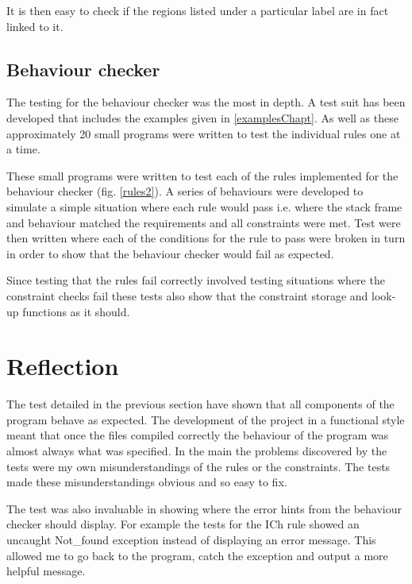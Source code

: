 It is then easy to check if the regions listed under a particular label are in fact linked to it. 

\subsection{Behaviour checker}

The testing for the behaviour checker was the most in depth. A test suit has been developed that includes the examples given in \ref{examplesChapt}. As well as these approximately 20 small programs were written to test the individual rules one at a time. 

These small programs were written to test each of the rules implemented for the behaviour checker (fig. \ref{rules2}). A series of behaviours were developed to simulate a simple situation where each rule would pass i.e. where the stack frame and behaviour matched the requirements and all constraints were met. Test were then written where each of the conditions for the rule to pass were broken in turn in order to show that the behaviour checker would fail as expected. 

Since testing that the rules fail correctly involved testing situations where the constraint checks fail these tests also show that the constraint storage and look-up functions as it should.

\section{Reflection}

The test detailed in the previous section have shown that all components of the program behave as expected. The development of the project in a functional style meant that once the files compiled correctly the behaviour of the program was almost always what was specified. In the main the problems discovered by the tests were my own misunderstandings of the rules or the constraints. The tests made these misunderstandings obvious and so easy to fix. 

The test was also invaluable in showing where the error hints from the behaviour checker should display. For example the tests for the ICh rule showed an uncaught Not_found exception instead of displaying an error message. This allowed me to go back to the program, catch the exception and output a more helpful message. 

